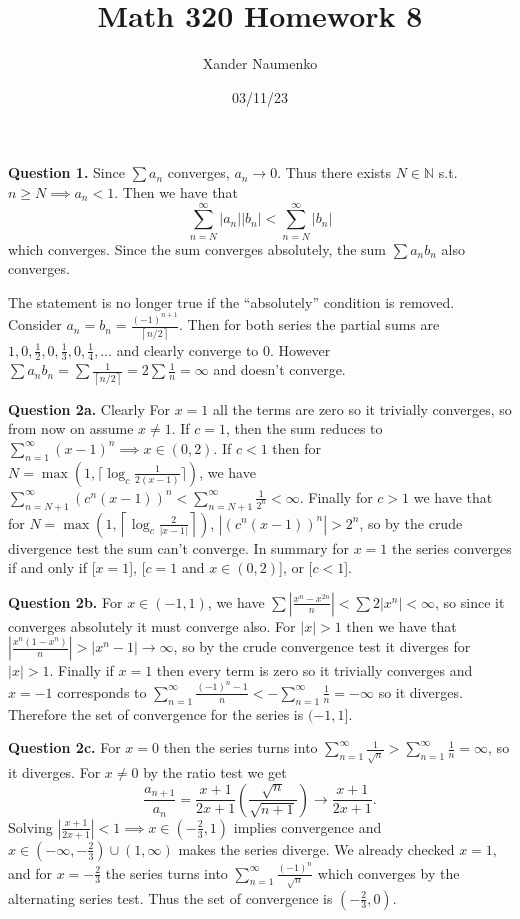 \documentclass[letterpaper, reqno,11pt]{article}
\begin{document}
\title{Math 320 Homework 8}
\date{03/11/23}
\author{Xander Naumenko}
\maketitle

{\medskip\noindent\bf Question 1.} Since $\sum a_n$ converges, $a_n\to 0$. Thus there exists $N\in \mathbb{N}$ s.t. $n\geq N\implies a_n<1$. Then we have that 
\[
\sum_{n=N}^{\infty}\left| a_n \right| \left| b_n \right| <\sum_{n=N}^{\infty}|b_n|
\]
which converges. Since the sum converges absolutely, the sum $\sum a_nb_n$ also converges.

The statement is no longer true if the ``absolutely'' condition is removed. Consider $a_n=b_n=\frac{(-1)^{n+1}}{\left\lceil n /2 \right\rceil }$. Then for both series the partial sums are $1,0,\frac{1}{2},0,\frac{1}{3},0,\frac{1}{4},\ldots$ and clearly converge to 0. However $\sum a_nb_n=\sum \frac{1}{\left\lceil n/2 \right\rceil}=2\sum \frac{1}{n}=\infty$ and doesn't converge.

\newpage\phantom{blabla}
\newpage

{\medskip\noindent\bf Question 2a.} Clearly For $x=1$ all the terms are zero so it trivially converges, so from now on assume $x\neq 1$. If $c=1$, then the sum reduces to $\sum_{n=1}^{\infty}(x-1)^{n}\implies x\in (0,2)$. If $c<1$ then for $N=\max(1,\lceil\log_c \frac{1}{2(x-1)}\rceil)$, we have $\sum_{n=N+1}^{\infty}(c^{n}(x-1))^{n}<\sum_{n=N+1}^{\infty}\frac{1}{2^{n}}<\infty$. Finally for $c>1$ we have that for $N=\max(1, \left\lceil \log_c \frac{2}{|x-1|} \right\rceil )$, $\left|(c^{n}(x-1))^{n}\right|>2^{n}$, so by the crude divergence test the sum can't converge. In summary for $x=1$ the series converges if and only if [$x=1$], [$c=1$ and $x\in (0,2)$], or [$c<1$].

{\medskip\noindent\bf Question 2b.} For $x\in(-1,1)$, we have $\sum \left|\frac{x^{n}-x^{2n}}{n}\right|<\sum 2|x^{n}|<\infty$, so since it converges absolutely it must converge also. For $|x|>1$ then we have that $\left|\frac{x^{n}(1-x^{n})}{n}\right|> |x^{n}-1| \to\infty$, so by the crude convergence test it diverges for $|x|>1$. Finally if $x=1$ then every term is zero so it trivially converges and $x=-1$ corresponds to $\sum_{n=1}^{\infty} \frac{(-1)^{n}-1}{n}<-\sum_{n=1}^{\infty}\frac{1}{n}=-\infty$ so it diverges. Therefore the set of convergence for the series is $(-1,1]$.

{\medskip\noindent\bf Question 2c.} For $x=0$ then the series turns into $\sum_{n=1}^{\infty}\frac{1}{\sqrt{n}}>\sum_{n=1}^{\infty}\frac{1}{n}=\infty$, so it diverges. For $x\neq 0$ by the ratio test we get
\[
\frac{a_{n+1}}{a_n}=\frac{x+1}{2x+1}\left( \frac{\sqrt{n}}{\sqrt{n+1}} \right) \to \frac{x+1}{2x+1}
.\]
Solving $\left|\frac{x+1}{2x+1}\right|<1\implies x\in(-\frac{2}{3},1)$ implies convergence and $x\in (-\infty,-\frac{2}{3})\cup (1,\infty)$ makes the series diverge. We already checked $x=1$, and for $x=-\frac{2}{3}$ the series turns into $\sum_{n=1}^{\infty}\frac{(-1)^{n}}{\sqrt{n}}$ which converges by the alternating series test. Thus the set of convergence is $(-\frac{2}{3},0)$.
\end{document}
